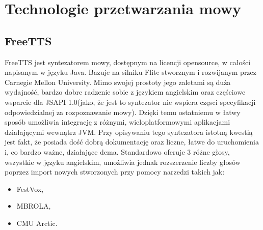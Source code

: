 \section{Technologie przetwarzania mowy}		
\subsection{FreeTTS}
FreeTTS \cite{freettssite} jest syntezatorem mowy, dostępnym na licencji opensource, w całości napisanym w języku Java. Bazuje na silniku Flite stworznym i rozwijanym przez Carnegie Mellon University. Mimo swojej prostoty jego zaletami są duża wydajność, bardzo dobre radzenie sobie z językiem angielskim oraz częściowe wsparcie dla JSAPI 1.0(jako, że jest to syntezator nie wspiera częsci specyfikacji odpowiedzialnej za rozpoznawanie mowy). Dzięki temu ostatniemu w łatwy sposób umożliwia integrację z różnymi, wieloplatformowymi aplikacjami działającymi wewnątrz JVM. Przy opisywaniu tego syntezatora istotną kwestią jest fakt, że posiada dość dobrą dokumentację oraz liczne, łatwe do uruchomienia i, co bardzo ważne, działające dema. Standardowo oferuje 3 różne głosy, wszystkie w języku angielskim, umożliwia jednak rozszerzenie liczby głosów poprzez import nowych stworzonych przy pomocy narzedzi takich jak:
\begin{itemize}
	\item FestVox,
	\item MBROLA,
	\item CMU Arctic.
\end{itemize}    

